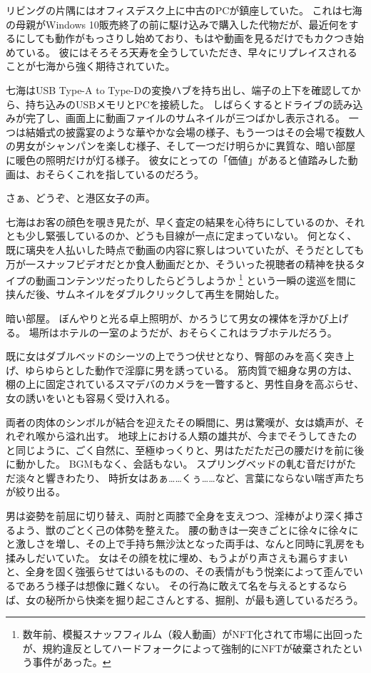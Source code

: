 リビングの片隅にはオフィスデスク上に中古のPCが鎮座していた。
これは七海の母親がWindows 10販売終了の前に駆け込みで購入した代物だが、最近何をするにしても動作がもっさりし始めており、もはや動画を見るだけでもカクつき始めている。
彼にはそろそろ天寿を全うしていただき、早々にリプレイスされることが七海から強く期待されていた。

七海はUSB Type-A to Type-Dの変換ハブを持ち出し、端子の上下を確認してから、持ち込みのUSBメモリとPCを接続した。
しばらくするとドライブの読み込みが完了し、画面上に動画ファイルのサムネイルが三つばかし表示される。
一つは結婚式の披露宴のような華やかな会場の様子、もう一つはその会場で複数人の男女がシャンパンを楽しむ様子、そして一つだけ明らかに異質な、暗い部屋に暖色の照明だけが灯る様子。
彼女にとっての「価値」があると値踏みした動画は、おそらくこれを指しているのだろう。

さぁ、どうぞ、と港区女子の声。

七海はお客の顔色を覗き見たが、早く査定の結果を心待ちにしているのか、それとも少し緊張しているのか、どうも目線が一点に定まっていない。
何となく、既に璃央を人払いした時点で動画の内容に察しはついていたが、そうだとしても万が一スナッフビデオだとか食人動画だとか、そういった視聴者の精神を抉るタイプの動画コンテンツだったりしたらどうしようか
\footnote{数年前、模擬スナッフフィルム（殺人動画）がNFT化されて市場に出回ったが、規約違反としてハードフォークによって強制的にNFTが破棄されたという事件があった。}
という一瞬の逡巡を間に挟んだ後、サムネイルをダブルクリックして再生を開始した。

\sectionbreak

暗い部屋。
ぼんやりと光る卓上照明が、かろうじて男女の裸体を浮かび上げる。
場所はホテルの一室のようだが、おそらくこれはラブホテルだろう。

既に女はダブルベッドのシーツの上でうつ伏せとなり、臀部のみを高く突き上げ、ゆらゆらとした動作で淫靡に男を誘っている。
筋肉質で細身な男の方は、棚の上に固定されているスマデバのカメラを一瞥すると、男性自身を高ぶらせ、女の誘いをいとも容易く受け入れる。

両者の肉体のシンボルが結合を迎えたその瞬間に、男は驚嘆が、女は嬌声が、それぞれ喉から溢れ出す。
地球上における人類の雄共が、今までそうしてきたのと同じように、ごく自然に、至極ゆっくりと、男はただただ己の腰だけを前に後に動かした。
BGMもなく、会話もない。
スプリングベッドの軋む音だけがただ淡々と響きわたり、
時折女はあぁ……くぅ……など、言葉にならない喘ぎ声たちが絞り出る。

男は姿勢を前屈に切り替え、両肘と両膝で全身を支えつつ、淫棒がより深く挿さるよう、獣のごとく己の体勢を整えた。
腰の動きは一突きごとに徐々に徐々にと激しさを増し、その上で手持ち無沙汰となった両手は、なんと同時に乳房をも揉みしだいていた。
女はその顔を枕に埋め、もうよがり声さえも漏らすまいと、全身を固く強張らせてはいるものの、その表情がもう悦楽によって歪んでいるであろう様子は想像に難くない。
その行為に敢えて名を与えるとするならば、女の秘所から快楽を掘り起こさんとする、掘削、が最も適しているだろう。

